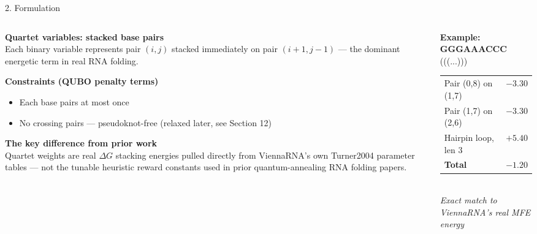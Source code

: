 \documentclass[aspectratio=169,10pt]{beamer}
\begin{document}
\begin{frame}{2. Formulation}
  \begin{columns}[T]
    \begin{column}{0.52\textwidth}
      \textbf{\color{navy}Quartet variables: stacked base pairs}\\[4pt]
      \small Each binary variable represents pair $(i,j)$ stacked immediately on pair $(i{+}1,j{-}1)$ --- the dominant energetic term in real RNA folding.
      \vspace{10pt}

      \textbf{\color{navy}Constraints (QUBO penalty terms)}
      \begin{itemize}\small
        \item Each base pairs at most once
        \item No crossing pairs --- pseudoknot-free (relaxed later, see Section 12)
      \end{itemize}
      \vspace{10pt}
      \begin{navybox}
      \textbf{\color{accent}The key difference from prior work}\\[3pt]
      \footnotesize Quartet weights are real $\Delta G$ stacking energies pulled directly from ViennaRNA's own Turner2004 parameter tables --- not the tunable heuristic reward constants used in prior quantum-annealing RNA folding papers.
      \end{navybox}
    \end{column}
    \begin{column}{0.44\textwidth}
      \begin{cardbox}
      \textbf{\color{navy}Example: GGGAAACCC}\\[6pt]
      {\ttfamily\Large (((...)))}\\[10pt]
      \small
      \begin{tabular}{@{}lr@{}}
        Pair (0,8) on (1,7) & $-3.30$ \\
        Pair (1,7) on (2,6) & $-3.30$ \\
        Hairpin loop, len 3 & $+5.40$ \\
        \midrule
        \textbf{Total} & \textbf{$-1.20$} \\
      \end{tabular}\\[6pt]
      \footnotesize\textit{Exact match to ViennaRNA's real MFE energy}
      \end{cardbox}
    \end{column}
  \end{columns}
\end{frame}
\end{document}
